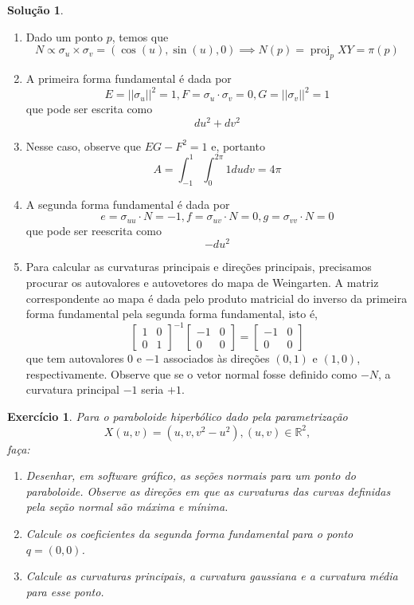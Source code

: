 \documentclass[a4paper,12pt]{article}
\newcommand{\R}{\mathbb{R}}
\theoremstyle{exer}
\newtheorem{exercise}{Exercício}
\theoremstyle{definition}
\newtheorem{solution}{Solução}
\theoremstyle{plain}
\begin{document}
\begin{solution}
\begin{enumerate}
        \item[(c)] Dado um ponto $p$, temos que 
        $$
        N \propto \sigma_u \times \sigma_v = (\cos(u), \sin(u), 0) \implies N(p) = \operatorname{proj}_p XY = \pi(p)
        $$
        \item[(d)] A primeira forma fundamental é dada por 
        $$
        E = ||\sigma_u||^2 = 1, F = \sigma_u\cdot\sigma_v = 0, G = ||\sigma_v||^2 = 1
        $$
        que pode ser escrita como 
        $$
        du^2 + dv^2
        $$
        \item[(e)] Nesse caso, observe que $EG - F^2 = 1$ e, portanto
        $$
        A = \int_{-1}^1\int_0^{2\pi} 1 du dv = 4\pi
        $$
        \item[(f)] A segunda forma fundamental é dada por 
        $$
        e = \sigma_{uu}\cdot N = -1, f = \sigma_{uv}\cdot N = 0, g = \sigma_{vv}\cdot N = 0
        $$
        que pode ser reescrita como 
        $$
        -du^2
        $$ 
        \item[(g)] Para calcular as curvaturas principais e direções
        principais, precisamos procurar os autovalores e autovetores do mapa
        de Weingarten. A matriz correspondente ao mapa é dada pelo produto
        matricial do inverso da primeira forma fundamental pela segunda forma
        fundamental, isto é, 
        $$
        \begin{bmatrix}
            1 & 0 \\ 0 & 1
        \end{bmatrix}^{-1}\begin{bmatrix}
            -1 & 0 \\ 0 & 0 
        \end{bmatrix} = \begin{bmatrix}
            -1 & 0 \\ 0 & 0 
        \end{bmatrix}
        $$
        que tem autovalores $0$ e $-1$ associados às direções $(0,1)$ e
        $(1,0)$, respectivamente. Observe que se o vetor normal fosse definido
        como $-N$, a curvatura principal $-1$ seria $+1$.
    \end{enumerate}
\end{solution}

\begin{exercise}
    Para o paraboloide hiperbólico dado pela parametrização $$X(u, v) = (u, v,
    v^2 - u^2), (u, v) \in \R^2,$$ faça:
    \begin{enumerate}
        \item[(a)] Desenhar, em software gráfico, as seções normais para um
        ponto do paraboloide. Observe as direções em que as curvaturas das curvas
        definidas pela seção normal são máxima e mínima. 
        \item[(b)] Calcule os coeficientes da segunda forma fundamental para o
        ponto $q = (0, 0)$.  
        \item[(c)] Calcule as curvaturas principais, a curvatura gaussiana e a
        curvatura média para esse ponto.
    \end{enumerate}
\end{exercise}
\end{document}
